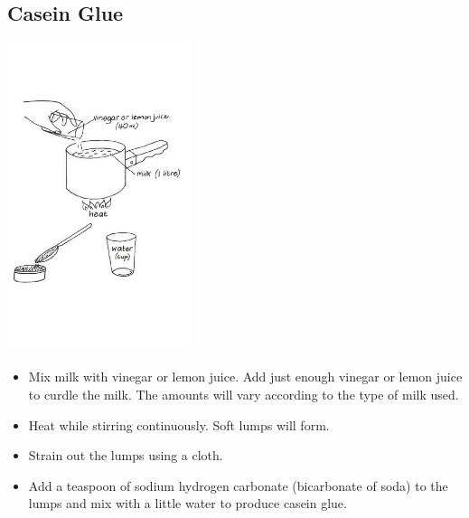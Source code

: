 \begin{multicols}{2}
\section{Casein Glue}

\begin{center}
\includegraphics[width=0.4\textwidth]{./img/vso/casein-glue.jpg}
\end{center}

\begin{itemize}
\item Mix milk with vinegar or lemon
juice. Add just enough vinegar
or lemon juice to curdle the
milk. The amounts will vary
according to the type of milk
used.
\item Heat while stirring
continuously. Soft lumps will
form.
\item Strain out the lumps using a
cloth.
\item Add a teaspoon of sodium
hydrogen carbonate
(bicarbonate of soda) to the
lumps and mix with a little
water to produce casein glue.
\end{itemize}

\vfill


\end{multicols}